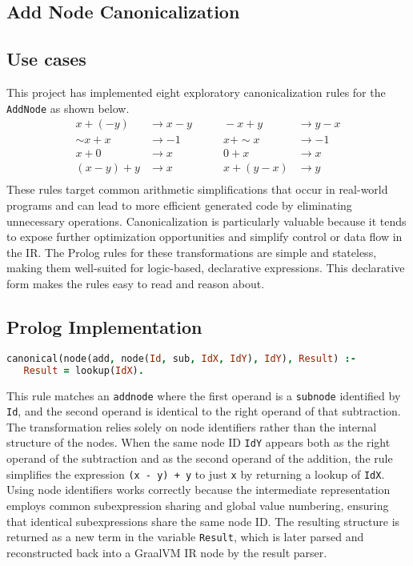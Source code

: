 \lstset{
    aboveskip=5pt,
    belowskip=5pt
}
\subsection{Add Node Canonicalization}
\subsection*{Use cases}
This project has implemented eight exploratory canonicalization rules for the \texttt{AddNode} as shown below.
\begin{align*}
    x + (-y)          &\rightarrow x - y        &\qquad -x + y           &\rightarrow y - x \\
    \sim x + x        &\rightarrow -1           &\qquad x + \sim x       &\rightarrow -1     \\
    x + 0             &\rightarrow x            &\qquad 0 + x            &\rightarrow x      \\
    (x - y) + y       &\rightarrow x            &\qquad x + (y - x)      &\rightarrow y      \\
\end{align*}
These rules target common arithmetic simplifications that occur in real-world programs and can lead to more efficient generated code by eliminating unnecessary operations.
Canonicalization is particularly valuable because it tends to expose further optimization opportunities and simplify control or data flow in the IR.
The Prolog rules for these transformations are simple and stateless, making them well-suited for logic-based, declarative expressions.
This declarative form makes the rules easy to read and reason about.

\subsection*{Prolog Implementation}
\begin{lstlisting}[language=Prolog]
% (x - y) + y -> x
canonical(node(add, node(Id, sub, IdX, IdY), IdY), Result) :-
   Result = lookup(IdX).
\end{lstlisting}
    
This rule matches an \texttt{addnode} where the first operand is a \texttt{subnode} identified by \texttt{Id}, and the second operand is identical to the right operand of that subtraction. The transformation relies solely on node identifiers rather than the internal structure of the nodes. When the same node ID \texttt{IdY} appears both as the right operand of the subtraction and as the second operand of the addition, the rule simplifies the expression \texttt{(x - y) + y} to just \texttt{x} by returning a lookup of \texttt{IdX}. Using node identifiers works correctly because the intermediate representation employs common subexpression sharing and global value numbering, ensuring that identical subexpressions share the same node ID. The resulting structure is returned as a new term in the variable \texttt{Result}, which is later parsed and reconstructed back into a GraalVM IR node by the result parser.

